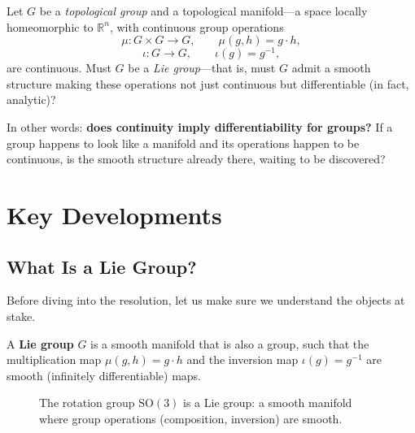 \begin{problem_statement}
Let $G$ be a \emph{topological group} and a topological manifold---a space locally homeomorphic to $\mathbb{R}^n$, with continuous group operations
\[
    \mu \colon G \times G \to G, \qquad \mu(g,h) = g \cdot h,
\]
\[
    \iota \colon G \to G, \qquad \iota(g) = g^{-1},
\]
are continuous. Must $G$ be a \emph{Lie group}---that is, must $G$ admit a smooth structure making these operations not just continuous but differentiable (in fact, analytic)?
\end{problem_statement}

In other words: \textbf{does continuity imply differentiability for groups?} If a group happens to look like a manifold and its operations happen to be continuous, is the smooth structure already there, waiting to be discovered?

\section{Key Developments}

\subsection{What Is a Lie Group?}

Before diving into the resolution, let us make sure we understand the objects at stake.

\begin{definition}
A \textbf{Lie group} $G$ is a smooth manifold that is also a group, such that the multiplication map $\mu(g,h) = g \cdot h$ and the inversion map $\iota(g) = g^{-1}$ are smooth (infinitely differentiable) maps.
\end{definition}

\begin{figure}[htbp]
\centering
{}
\caption{The rotation group $\mathrm{SO}(3)$ is a Lie group: a smooth manifold where group operations (composition, inversion) are smooth.}
\label{fig:lie-group}
\end{figure}

